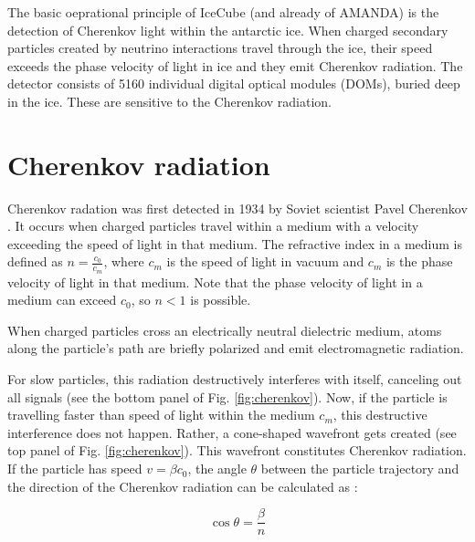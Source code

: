 \documentclass[
    a4paper, %
    fontsize=10pt, %
    twoside=true, %
    numbers=noenddot, %
    fontmethod=tex, %
]{kaobook}
\begin{document}
The basic oeprational principle of IceCube (and already of AMANDA) is the detection of Cherenkov light within the antarctic ice. When charged secondary particles created by neutrino interactions travel through the ice, their speed exceeds the phase velocity of light in ice and they emit Cherenkov radiation. The detector consists of 5160 individual digital optical modules (DOMs), buried deep in the ice. These are sensitive to the Cherenkov radiation.

\section{Cherenkov radiation} \label{cherenkov_radiation}

Cherenkov radation was first detected in 1934 by Soviet scientist Pavel Cherenkov . It occurs when charged particles travel within a medium with a velocity exceeding the speed of light in that medium. The refractive index in a medium is defined as $n=\frac{c_0}{c_m}$, where $c_m$ is the speed of light in vacuum and $c_m$ is the phase velocity of light in that medium. Note that the phase velocity of light in a medium can exceed $c_0$, so $n<1$ is possible. 

When charged particles cross an electrically neutral dielectric medium, atoms along the particle's path are briefly polarized and emit electromagnetic radiation. 

For slow particles, this radiation destructively interferes with itself, canceling out all signals (see the bottom panel of Fig. \ref{fig:cherenkov}). Now, if the particle is travelling faster than speed of light within the medium $c_m$, this destructive interference does not happen. Rather, a cone-shaped wavefront gets created (see top panel of Fig. \ref{fig:cherenkov}). This wavefront constitutes Cherenkov radiation. If the particle has speed $v=\beta c_0$, the angle $\theta$ between the particle trajectory and the direction of the Cherenkov radiation can be calculated as :

\begin{equation}
\cos{\theta} = \frac{\beta}{n}
\end{equation}
\end{document}
